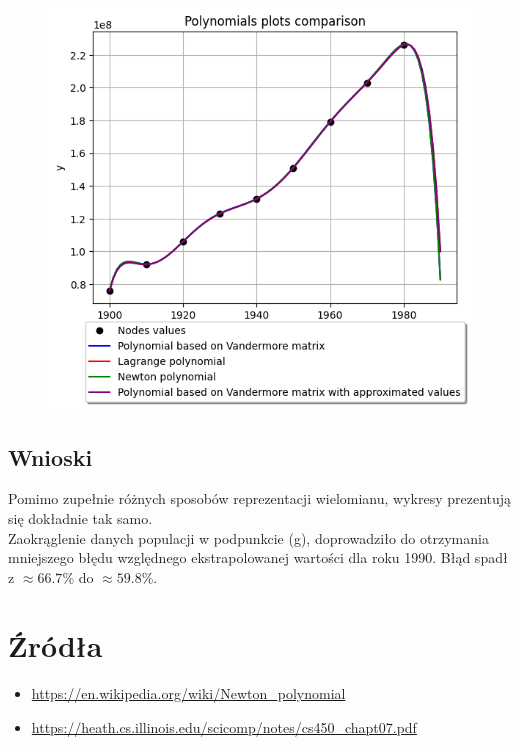 \documentclass{article}
\begin{document}
\begin{figure}[H]
  \includegraphics[width=\linewidth]{figures/comparison.png}
\end{figure}

\subsection*{Wnioski}
\null\quad Pomimo zupełnie różnych sposobów reprezentacji wielomianu, 
wykresy prezentują się dokładnie tak samo. \\
\null\quad Zaokrąglenie danych populacji w podpunkcie (g), 
doprowadziło do otrzymania mniejszego błędu względnego ekstrapolowanej 
wartości dla roku 1990. Błąd spadł z $\approx 66.7\%$ do $\approx 59.8\%$.

\section*{Źródła}
\begin{itemize}
    \item \url{https://en.wikipedia.org/wiki/Newton_polynomial}
    \item \url{https://heath.cs.illinois.edu/scicomp/notes/cs450_chapt07.pdf}
\end{itemize}
\end{document}
